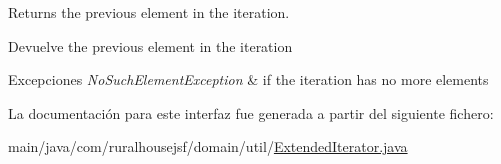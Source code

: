 Returns the previous element in the iteration. 

\begin{DoxyReturn}{Devuelve}
the previous element in the iteration 
\end{DoxyReturn}

\begin{DoxyExceptions}{Excepciones}
{\em No\+Such\+Element\+Exception} & if the iteration has no more elements \\
\hline
\end{DoxyExceptions}


La documentación para este interfaz fue generada a partir del siguiente fichero\+:\begin{DoxyCompactItemize}
\item 
main/java/com/ruralhousejsf/domain/util/\mbox{\hyperlink{a00050}{Extended\+Iterator.\+java}}\end{DoxyCompactItemize}
